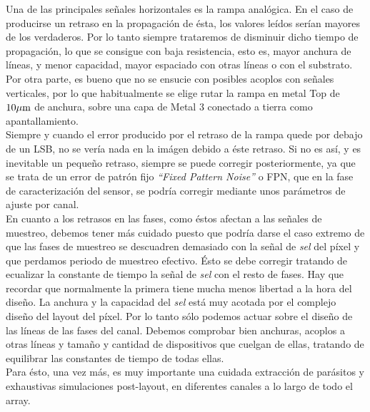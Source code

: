 Una de las principales señales horizontales es la rampa analógica. En el caso de
producirse un retraso en la propagación de ésta, los valores leídos serían mayores
de los verdaderos. Por lo tanto siempre trataremos de disminuir dicho tiempo de
propagación, lo que se consigue con baja resistencia, esto es, mayor anchura de
líneas, y menor capacidad, mayor espaciado con otras líneas o con el substrato.
Por otra parte, es bueno que no se ensucie con posibles acoplos con señales verticales,
por lo que habitualmente se elige rutar la rampa en metal Top de $10\mu\text{m}$ de anchura,
sobre una capa de Metal 3 conectado a tierra como apantallamiento.\\

Siempre y cuando el error producido por el retraso de la rampa quede por debajo
de un LSB, no se vería nada en la imágen debido a éste retraso. Si no es así, y es
inevitable un pequeño retraso, siempre se puede corregir posteriormente, ya que
se trata de un error de patrón fijo \textit{``Fixed Pattern Noise''} o FPN, que
en la fase de caracterización del sensor, se podría corregir mediante unos
parámetros de ajuste por canal.\\

En cuanto a los retrasos en las fases, como éstos afectan a las señales de
muestreo, debemos tener más cuidado puesto que podría darse el caso extremo de
que las fases de muestreo se descuadren demasiado con la señal de \textit{sel} del
píxel y que perdamos periodo de muestreo efectivo. Ésto se debe corregir tratando
de ecualizar la constante de tiempo la señal de \textit{sel} con el resto de
fases. Hay que recordar que normalmente la primera tiene mucha menos libertad a la
hora del diseño. La anchura y la capacidad del \textit{sel} está muy acotada
por el complejo diseño del layout del píxel. Por lo tanto sólo podemos actuar
sobre el diseño de las líneas de las fases del canal. Debemos comprobar bien
anchuras, acoplos a otras líneas y tamaño y cantidad de dispositivos que cuelgan
de ellas, tratando de equilibrar las constantes de tiempo de todas ellas.\\

Para ésto, una vez más, es muy importante una cuidada extracción de parásitos y
exhaustivas simulaciones post-layout, en diferentes canales a lo largo de todo el
array.\\


\begin{figure}[b]


\end{figure}

